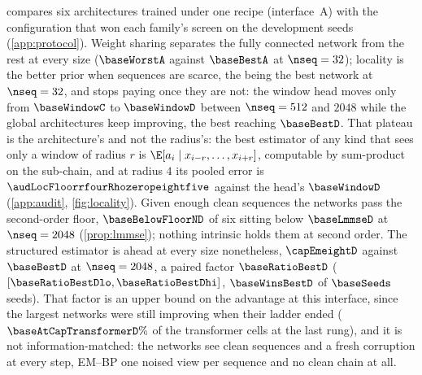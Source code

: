 
 compares six architectures trained under one recipe (interface~A)
with the configuration that won each family's screen on the development seeds
(\cref{app:protocol}). Weight sharing separates the fully connected network from the rest
at every size ($\baseWorstA$ against $\baseBestA$ at $\nseq=32$); locality is the better
prior when sequences are scarce, the \baseBestArchA{} being the best network at
$\nseq=32$, and stops paying once they are not: the window head moves only from
$\baseWindowC$ to $\baseWindowD$ between $\nseq=512$ and $2048$ while the global
architectures keep improving, the best reaching $\baseBestD$. That plateau is the
architecture's and not the radius's: the best estimator of any kind that sees only a
window of radius $r$ is $\E[a_i\mid x_{i-r},\dots,x_{i+r}]$, computable by sum-product on
the sub-chain, and at radius $4$ its pooled error is $\audLocFloorrfourRhozeropeightfive$
against the head's $\baseWindowD$ (\cref{app:audit}, \cref{fig:locality}). Given enough
clean sequences the networks pass the second-order floor, $\baseBelowFloorND$ of six
sitting below $\baseLmmseD$ at $\nseq=2048$ (\cref{prop:lmmse}); nothing intrinsic holds
them at second order. The structured estimator is ahead at every size nonetheless,
$\capEmeightD$ against $\baseBestD$ at $\nseq=2048$, a paired factor $\baseRatioBestD$
($[\baseRatioBestDlo,\baseRatioBestDhi]$, $\baseWinsBestD$ of $\baseSeeds$ seeds). That
factor is an upper bound on the advantage at this interface, since the largest networks
were still improving when their ladder ended ($\baseAtCapTransformerD\%$ of the
transformer cells at the last rung), and it is not information-matched: the networks see
clean sequences and a fresh corruption at every step, EM--BP one noised view per sequence
and no clean chain at all.

